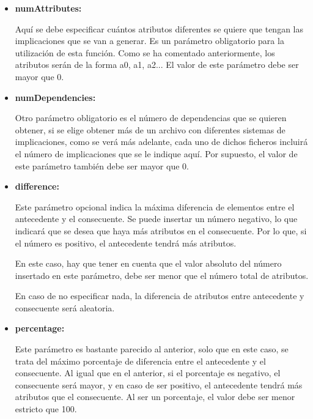     \begin{itemize}
        \item \textbf{numAttributes:}

        Aqu\'i se debe especificar cu\'antos atributos diferentes se quiere que tengan las implicaciones que se van a generar. Es un 
        par\'ametro obligatorio para la utilizaci\'on de esta funci\'on. Como se ha comentado anteriormente, los atributos ser\'an de la 
        forma a0, a1, a2... El valor de este par\'ametro debe ser mayor que 0.

        \clearpage

        \item \textbf{numDependencies:}

        Otro par\'ametro obligatorio es el n\'umero de dependencias que se quieren obtener, si se elige obtener m\'as de un archivo 
        con diferentes sistemas de implicaciones, como se ver\'a m\'as adelante, cada uno de dichos ficheros incluir\'a el n\'umero 
        de implicaciones que se le indique aqu\'i. Por supuesto, el valor de este par\'ametro tambi\'en debe ser mayor que 0.

        
        \item \textbf{difference:}

        Este par\'ametro opcional indica la m\'axima diferencia de elementos entre el antecedente y el consecuente. Se puede 
        insertar un n\'umero negativo, lo que indicar\'a que se desea que haya m\'as atributos en el consecuente. Por lo que, si el n\'umero 
        es positivo, el antecedente tendr\'a m\'as atributos.

        En este caso, hay que tener en cuenta que el valor absoluto del n\'umero insertado en este par\'ametro, debe ser menor 
        que el n\'umero total de atributos.

        En caso de no especificar nada, la diferencia de atributos entre antecedente y consecuente ser\'a aleatoria.


        \item \textbf{percentage:}

        Este par\'ametro es bastante parecido al anterior, solo que en este caso, se trata del m\'aximo porcentaje de diferencia entre 
        el antecedente y el consecuente. Al igual que en el anterior, si el porcentaje es negativo, el consecuente ser\'a mayor, y en caso de 
        ser positivo, el antecedente tendr\'a m\'as atributos que el consecuente. Al ser un porcentaje, el valor debe ser menor estricto que 
        100.


\end{itemize}
